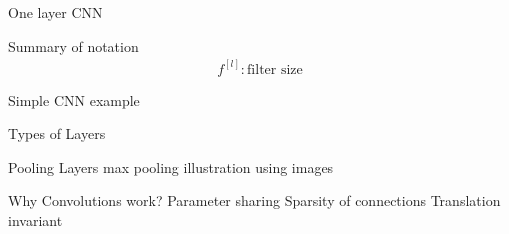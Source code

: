 \documentclass{beamer}
\begin{document}
\begin{frame}{One layer CNN}
\end{frame}

\begin{frame}{Summary of notation}
\begin{align}
f^{[l]}: \text{filter size}
\end{align}
\end{frame}

\begin{frame}{Simple CNN example}
\end{frame}

\begin{frame}{Types of Layers}
\end{frame}

\begin{frame}{Pooling Layers}
max pooling illustration using images
\end{frame}

\begin{frame}{Why Convolutions work?}
Parameter sharing
Sparsity of connections 
Translation invariant
\end{frame}
\end{document}
